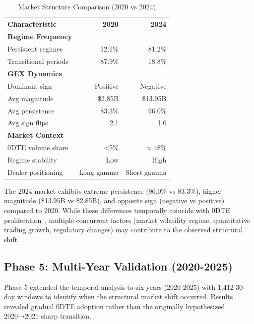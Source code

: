 \begin{table}[ht]
\centering
\caption{Market Structure Comparison (2020 vs 2024)}
\begin{tabular}{lrr}
\toprule
\textbf{Characteristic} & \textbf{2020} & \textbf{2024} \\
\midrule
\textbf{Regime Frequency} & & \\
\quad Persistent regimes & 12.1\% & 81.2\% \\
\quad Transitional periods & 87.9\% & 18.8\% \\
\midrule
\textbf{GEX Dynamics} & & \\
\quad Dominant sign & Positive & Negative \\
\quad Avg magnitude & \$2.85B & \$13.95B \\
\quad Avg persistence & 83.3\% & 96.0\% \\
\quad Avg sign flips & 2.1 & 1.0 \\
\midrule
\textbf{Market Context} & & \\
\quad 0DTE volume share & <5\% & $\approx$48\% \\
\quad Regime stability & Low & High \\
\quad Dealer positioning & Long gamma & Short gamma \\
\bottomrule
\end{tabular}
\end{table}

The 2024 market exhibits extreme persistence (96.0\% vs 83.3\%), higher magnitude (\$13.95B vs \$2.85B), and opposite sign (negative vs positive) compared to 2020. While these differences temporally coincide with 0DTE proliferation~\cite{cboe2024zero,dim2025zero}, multiple concurrent factors (market volatility regime, quantitative trading growth, regulatory changes) may contribute to the observed structural shift.

\subsection{Phase 5: Multi-Year Validation (2020-2025)}
\label{sec:phase5}

\vspace{0.2cm}

Phase 5 extended the temporal analysis to six years (2020-2025) with 1,412 30-day windows to identify when the structural market shift occurred. Results revealed gradual 0DTE adoption rather than the originally hypothesized 2020→2021 sharp transition.

